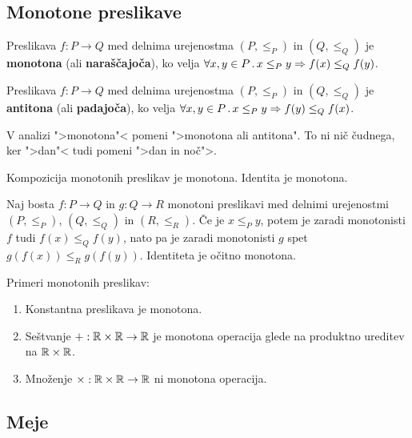 \subsection{Monotone preslikave}

\begin{definicija}
  Preslikava $f : P \to Q$ med delnima urejenostma $(P, {\leq_P})$ in $(Q, {\leq_Q})$ je
  \textbf{monotona} (ali \textbf{naraščajoča}), ko velja $\forall x, y \in P \,.\, x \leq_P y \Rightarrow f(x) \leq_Q f(y)$.
\end{definicija}

\begin{definicija}
  Preslikava $f : P \to Q$ med delnima urejenostma $(P, \leq_P)$ in $(Q, \leq_Q)$ je
  \textbf{antitona} (ali \textbf{padajoča}), ko velja $\forall x, y \in P \,.\, x \leq_P y \Rightarrow f(y) \leq_Q f(x)$.
\end{definicija}

\begin{opomba}
  V analizi ">monotona"< pomeni ">monotona ali antitona". To ni nič
  čudnega, ker ">dan"< tudi pomeni ">dan in noč">.
\end{opomba}

\begin{izrek}
  Kompozicija monotonih preslikav je monotona. Identita je monotona.
\end{izrek}

\begin{dokaz}
  Naj bosta $f : P \to Q$ in $g : Q \to R$ monotoni preslikavi med delnimi
  urejenostmi $(P, {\leq_P})$, $(Q, {\leq_Q})$ in $(R, {\leq_R})$. Če je $x \leq_P y$, potem je zaradi monotonisti $f$ tudi $f(x) \leq_Q f(y)$, nato pa je zaradi monotonisti $g$ spet $g(f(x)) \leq_R g(f(y))$. Identiteta je očitno monotona.
\end{dokaz}

\begin{primer}
  Primeri monotonih preslikav:
  \begin{enumerate}
    \item Konstantna preslikava je monotona.
    \item Seštvanje ${+} : \mathbb{R} \times \mathbb{R} \to \mathbb{R}$ je monotona operacija glede na produktno ureditev na $\mathbb{R} \times \mathbb{R}$.
    \item Množenje ${\times} : \mathbb{R} \times \mathbb{R} \to \mathbb{R}$ ni monotona operacija.
  \end{enumerate}
\end{primer}


\subsection{Meje}

